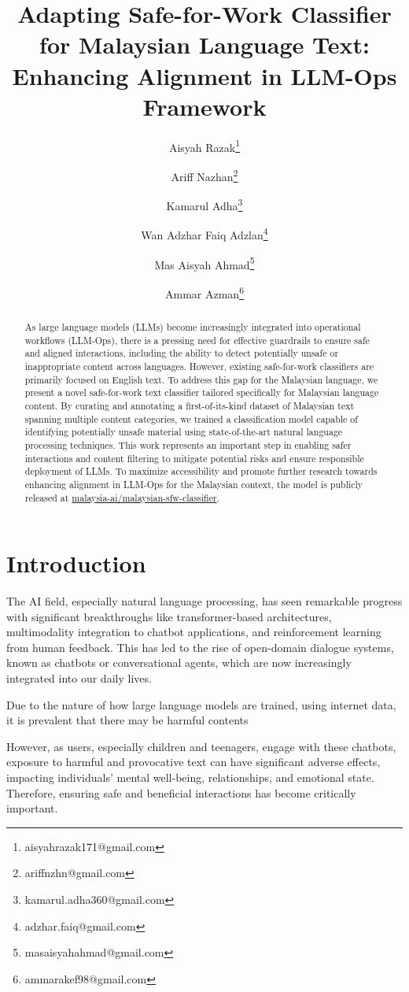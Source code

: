 \documentclass[preprint]{article}
\title{Adapting Safe-for-Work Classifier for Malaysian Language Text: Enhancing Alignment in LLM-Ops Framework}
\author{
  Aisyah Razak\thanks{aisyahrazak171@gmail.com} \and
  Ariff Nazhan\thanks{ariffnzhn@gmail.com} \and
  Kamarul Adha\thanks{kamarul.adha360@gmail.com} \and
  Wan Adzhar Faiq Adzlan\thanks{adzhar.faiq@gmail.com} \and
  Mas Aisyah Ahmad\thanks{masaisyahahmad@gmail.com} \and
  Ammar Azman\thanks{ammarakef98@gmail.com} \and
}
\begin{document}
\maketitle

\begin{abstract}

As large language models (LLMs) become increasingly integrated into operational workflows (LLM-Ops), there is a pressing need for effective guardrails to ensure safe and aligned interactions, including the ability to detect potentially unsafe or inappropriate content across languages. However, existing safe-for-work classifiers are primarily focused on English text. To address this gap for the Malaysian language, we present a novel safe-for-work text classifier tailored specifically for Malaysian language content. By curating and annotating a first-of-its-kind dataset of Malaysian text spanning multiple content categories, we trained a classification model capable of identifying potentially unsafe material using state-of-the-art natural language processing techniques. This work represents an important step in enabling safer interactions and content filtering to mitigate potential risks and ensure responsible deployment of LLMs. To maximize accessibility and promote further research towards enhancing alignment in LLM-Ops for the Malaysian context, the model is publicly released at \href{https://huggingface.co/malaysia-ai/malaysian-sfw-classifier}{malaysia-ai/malaysian-sfw-classifier}.
\end{abstract}


\section{Introduction}

The AI field, especially natural language processing, has seen remarkable progress with significant breakthroughs like transformer-based architectures, multimodality integration to chatbot applications, and reinforcement learning from human feedback. This has led to the rise of open-domain dialogue systems, known as chatbots or conversational agents, which are now increasingly integrated into our daily lives.

Due to the nature of how large language models are trained, using internet data, it is prevalent that there may be harmful contents 

However, as users, especially children and teenagers, engage with these chatbots, exposure to harmful and provocative text can have significant adverse effects, impacting individuals' mental well-being, relationships, and emotional state. Therefore, ensuring safe and beneficial interactions has become critically important.
\end{document}
